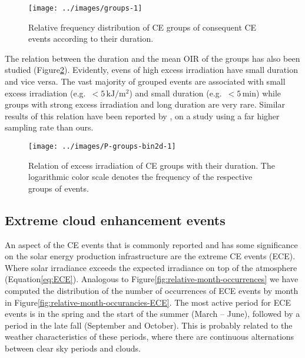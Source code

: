 \documentclass[preprint, 5p,
authoryear]{elsarticle} %
\begin{document}
\begin{figure}

{\centering \texttt{[image: ../images/groups-1]} 

}

\caption{Relative frequency distribution of CE groups of consequent CE events according to their duration.}\label{fig:ceg-duration-distribution}
\end{figure}

The relation between the duration and the mean OIR of the groups has
also been studied (Figure\nobreakspace{}\ref{fig:group-2d}). Evidently,
evens of high excess irradiation have small duration and vice versa. The
vast majority of grouped events are associated with small excess
irradiation (e.g.~\(<5\,\text{kJ}/\text{m}^2\)) and small duration
(e.g.~\(<5\,\text{min}\)) while groups with strong excess irradiation
and long duration are very rare. Similar results of this relation have
been reported by \citet{Zhang2018}, on a study using a far higher
sampling rate than ours.

\begin{figure}

{\centering \texttt{[image: ../images/P-groups-bin2d-1]} 

}

\caption{Relation of excess irradiation of CE groups with their duration. The logarithmic color scale denotes the frequency of the respective groups of events.}\label{fig:group-2d}
\end{figure}

\hypertarget{extreme-cloud-enhancement-events}{%
\subsection{Extreme cloud enhancement
events}\label{extreme-cloud-enhancement-events}}

An aspect of the CE events that is commonly reported and has some
significance on the solar energy production infrastructure are the
extreme CE events (ECE). Where solar irradiance exceeds the expected
irradiance on top of the atmosphere
(Equation\nobreakspace{}\ref{eq:ECE}). Analogous to
Figure\nobreakspace{}\ref{fig:relative-month-occurrences} we have
computed the distribution of the number of occurrences of ECE events by
month in Figure\nobreakspace{}\ref{fig:relative-month-occurancies-ECE}.
The most active period for ECE events is in the spring and the start of
the summer (March -- June), followed by a period in the late fall
(September and October). This is probably related to the weather
characteristics of these periods, where there are continuous
alternations between clear sky periods and clouds.
\end{document}
